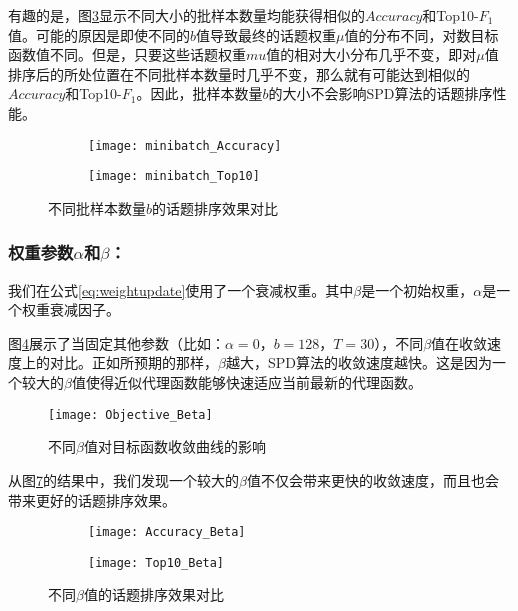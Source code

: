 有趣的是，图\ref{fig:minibatch-two-metric}显示不同大小的批样本数量均能获得相似的$Accuracy$和Top10-$F_1$值。可能的原因是即使不同的$b$值导致最终的话题权重$\mu$值的分布不同，对数目标函数值不同。但是，只要这些话题权重$mu$值的相对大小分布几乎不变，即对$\mu$值排序后的所处位置在不同批样本数量时几乎不变，那么就有可能达到相似的$Accuracy$和Top10-$F_1$。因此，批样本数量$b$的大小不会影响SPD算法的话题排序性能。
\begin{figure}[!htbp]
    \centering
    \begin{subfigure}[b]{0.5\textwidth}
      \texttt{[image: minibatch\_Accuracy]}
      \caption{}
      \label{fig:minibatch_Accuracy}
    \end{subfigure}%
    \begin{subfigure}[b]{0.5\textwidth}
      \texttt{[image: minibatch\_Top10]}
      \caption{}
      \label{fig:minibatch_Top10}
    \end{subfigure}
    \caption{不同批样本数量$b$的话题排序效果对比}
    \label{fig:minibatch-two-metric}
\end{figure}

\subsubsection{权重参数$\alpha$和$\beta$：}

我们在公式\eqref{eq:weightupdate}使用了一个衰减权重。其中$\beta$是一个初始权重，$\alpha$是一个权重衰减因子。

图\ref{fig:Objective_Beta}展示了当固定其他参数（比如：$\alpha=0$，$b=128$，$T=30$），不同$\beta$值在收敛速度上的对比。正如所预期的那样，$\beta$越大，SPD算法的收敛速度越快。这是因为一个较大的$\beta$值使得近似代理函数能够快速适应当前最新的代理函数。
\begin{figure}[!htbp]
    \centering
    \texttt{[image: Objective\_Beta]}
    \caption{不同$\beta$值对目标函数收敛曲线的影响}
    \label{fig:Objective_Beta}
\end{figure}

从图\ref{fig:differentbeta}的结果中，我们发现一个较大的$\beta$值不仅会带来更快的收敛速度，而且也会带来更好的话题排序效果。
\begin{figure}[!htbp]
    \centering
    \begin{subfigure}[b]{0.5\textwidth}
      \texttt{[image: Accuracy\_Beta]}
      \caption{}
      \label{fig:Accuracy_Beta}
    \end{subfigure}%
    \begin{subfigure}[b]{0.5\textwidth}
      \texttt{[image: Top10\_Beta]}
      \caption{}
      \label{fig:Top10_Beta}
    \end{subfigure}
    \caption{不同$\beta$值的话题排序效果对比}
    \label{fig:differentbeta}
\end{figure}

